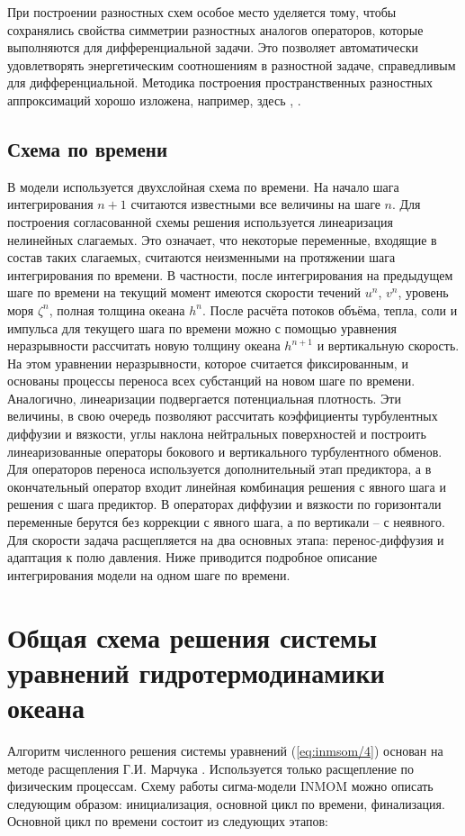 	При построении разностных схем особое место уделяется тому, чтобы сохранялись свойства симметрии разностных 
	аналогов операторов, которые выполняются для дифференциальной задачи. Это позволяет автоматически удовлетворять энергетическим соотношениям
	в разностной задаче, справедливым для дифференциальной. Методика построения пространственных разностных аппроксимаций хорошо изложена, например, здесь \cite{ROUCH}, \cite{MARCHUK}.
	
\subsection{Схема по времени}
	В модели используется двухслойная схема по времени. На начало шага интегрирования $n+1$ считаются известными все величины на шаге $n$. 
	Для построения согласованной схемы решения используется линеаризация нелинейных слагаемых. 
	Это означает, что некоторые переменные, входящие в состав таких слагаемых, считаются неизменными на протяжении шага интегрирования по времени. 
	В частности, после интегрирования на предыдущем шаге по времени на текущий момент имеются скорости течений $u^n$, $v^n$, уровень моря $\zeta^n$, полная толщина океана $h^n$. 
	После расчёта потоков объёма, тепла, соли и импульса для текущего шага по времени можно с помощью уравнения неразрывности рассчитать новую толщину океана $h^{n+1}$ и вертикальную скорость.
	На этом уравнении неразрывности, которое считается фиксированным, и основаны процессы переноса всех субстанций на новом шаге по времени. 
	Аналогично, линеаризации подвергается потенциальная плотность. 
	Эти величины, в свою очередь позволяют рассчитать коэффициенты турбулентных диффузии и вязкости, 
	углы наклона нейтральных поверхностей и построить линеаризованные операторы бокового и вертикального турбулентного обменов. 
	Для операторов переноса используется дополнительный этап предиктора, а в окончательный оператор входит линейная комбинация решения с явного шага и решения с шага предиктор. 
	В операторах диффузии и вязкости по горизонтали переменные берутся без коррекции с явного шага, а по вертикали – с неявного. 
	Для скорости задача расщепляется на два основных этапа: перенос-диффузия и адаптация к полю давления.
	Ниже приводится подробное описание интегрирования модели на одном шаге по времени.
	
\section{Общая схема решения системы уравнений гидротермодинамики океана}\label{sec:inmsom/ch1/sec3}
Алгоритм численного решения системы уравнений (\ref{eq:inmsom/4}) основан на методе расщепления Г.И. Марчука \cite{MARCHUK}. Используется только расщепление по физическим процессам. 
Схему работы сигма-модели INMOM можно описать следующим образом: инициализация, основной цикл по времени, финализация. Основной цикл по времени состоит из следующих этапов:

